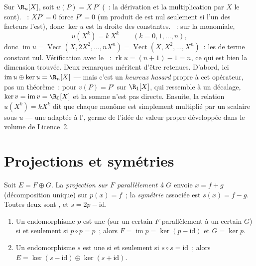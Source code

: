 \begin{example}
\label{ex:b1:linmaps:euler}
Sur $\R_n[X]$, soit $u(P) = X\,P'$ (~: la dérivation et la
multiplication par $X$ le sont). \emph{}~: $XP' = 0$ force $P' =
0$ (un produit de  est nul seulement si l'un des facteurs l'est),
donc $\ker u$ est la droite des constantes. \emph{}~: sur la
 monomiale,
\[
u(X^k) = k\,X^{k} \qquad (k = 0, 1, \dots, n),
\]
donc $\operatorname{im} u = \operatorname{Vect}(X, 2X^2, \dots,
nX^n) = \operatorname{Vect}(X, X^2, \dots, X^n)$~: les
 de terme constant nul. Vérification avec le ~:
$\operatorname{rk} u = (n + 1) - 1 = n$, ce qui est bien la
dimension trouvée. Deux remarques méritent d'être retenues. D'abord, ici
$\operatorname{im} u \oplus \ker u = \R_n[X]$ --- mais c'est un
\emph{heureux hasard} propre à cet opérateur, pas un théorème~: pour
$v(P) = P'$ sur $\R_1[X]$, qui ressemble à un décalage, $\ker v = \operatorname{im}
v = \R_0[X]$ et la somme n'est pas directe. Ensuite, la relation
$u(X^k) = kX^k$ dit que chaque monôme est simplement multiplié par un
scalaire sous $u$ --- une  adaptée à l', germe de l'idée
de valeur propre développée dans le volume de Licence~2.
\end{example}

\section{Projections et symétries}

\begin{definition}\label{def:b1:linmaps:projection}
Soit $E = F \oplus G$. La \emph{projection sur $F$ parallèlement à
$G$} envoie $x = f + g$ (décomposition unique) sur
$p(x) = f$~; la \emph{symétrie} associée est $s(x)
= f - g$. Toutes deux sont , et $s = 2p - \mathrm{id}$.
\end{definition}

\begin{theorem}\label{thm:b1:linmaps:projchar}
\begin{enumerate}
  \item Un endomorphisme $p$ est une  (sur un certain $F$
        parallèlement à un certain $G$) si et seulement si $p \circ p = p$~; alors $F =
        \operatorname{im} p = \ker(p - \mathrm{id})$ et $G = \ker
        p$.
  \item Un endomorphisme $s$ est une  si et seulement si $s \circ s
        = \mathrm{id}$~; alors $E = \ker(s - \mathrm{id}) \oplus
        \ker(s + \mathrm{id})$.
\end{enumerate}
\end{theorem}

